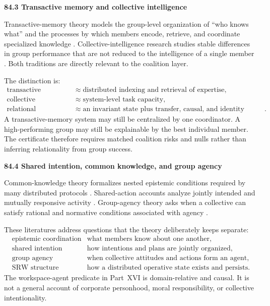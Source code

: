 \documentclass[11pt,letterpaper]{article}
\newcommand{\subtopic}[1]{%
 \vspace{0.45em}
 {\bfseries\color{AccentColor} #1\par}
}
\theoremstyle{plain}
\theoremstyle{definition}
\begin{document}
\subtopic{84.3 Transactive memory and collective intelligence}

Transactive-memory theory models the group-level organization of ``who knows
what'' and the processes by which members encode, retrieve, and coordinate
specialized knowledge \cite{Wegner1987,Lewis2003}. Collective-intelligence
research studies stable differences in group performance that are not reduced
to the intelligence of a single member \cite{WoolleyEtAl2010}. Both traditions
are directly relevant to the coalition layer.

The distinction is:
\[
\begin{aligned}
\text{transactive memory}
&\approx
\text{distributed indexing and retrieval of expertise},\\
\text{collective intelligence}
&\approx
\text{system-level task capacity},\\
\text{relational workspace}
&\approx
\text{an invariant state plus transfer, causal, and identity structure}.
\end{aligned}
\]
A transactive-memory system may still be centralized by one coordinator. A
high-performing group may still be explainable by the best individual member.
The certificate therefore requires matched coalition risks and nulls
rather than inferring relationality from group success.

\subtopic{84.4 Shared intention, common knowledge, and group agency}

Common-knowledge theory formalizes nested epistemic conditions required by
many distributed protocols \cite{HalpernMoses1990,FaginEtAl1995}. Shared-action
accounts analyze jointly intended and mutually responsive activity
\cite{Bratman1992}. Group-agency theory asks when a collective can satisfy
rational and normative conditions associated with agency
\cite{ListPettit2011}.

These literatures address questions that the theory deliberately keeps
separate:
\[
\begin{array}{ll}
\text{epistemic coordination} & \text{what members know about one another},\\
\text{shared intention} & \text{how intentions and plans are jointly organized},\\
\text{group agency} & \text{when collective attitudes and actions form an agent},\\
\text{SRW structure} & \text{how a distributed operative state exists and persists}.
\end{array}
\]
The workspace-agent predicate in Part~XVI is domain-relative and causal. It is
not a general account of corporate personhood, moral responsibility, or
collective intentionality.
\end{document}
